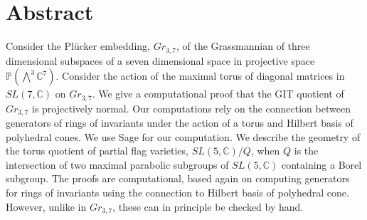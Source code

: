 \section{Abstract}\label{s.abstract}

Consider the Pl\"{u}cker embedding, $Gr_{3,7}$, of the Grassmannian of three dimensional subspaces of a seven dimensional space in projective space ${\mathbb P}(\bigwedge^3 {\mathbb C}^7 )$. Consider the action of the maximal torus of diagonal matrices in $SL(7,{\mathbb C})$ on $Gr_{3,7}$. We give a computational proof that the GIT quotient of $Gr_{3,7}$  is projectively normal. Our computations rely on the connection between generators of rings of invariants under the action of a torus and Hilbert basis of polyhedral cones. 
We use Sage for our computation. We describe the geometry of the torus quotient of partial flag varieties, $SL(5,{\mathbb C})/Q$, when $Q$ is the 
intersection of two maximal parabolic subgroups of $SL(5,{\mathbb C})$ containing a Borel subgroup. The proofs are computational, based again on computing generators for rings of 
invariants using the connection to Hilbert basis of polyhedral cone. However, unlike in $Gr_{3,7}$, these can in principle be checked by hand.